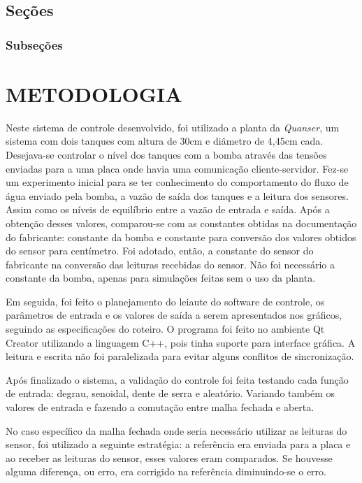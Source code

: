 \documentclass[a4paper,12pt]{article}
\begin{document}
\subsection{Seções}

\subsubsection{Subseções}

\newpage


\thispagestyle{main}

\section{METODOLOGIA}


\hspace{4ex}Neste sistema de controle desenvolvido, foi utilizado a planta da \textit{Quanser}, um sistema com dois tanques com altura de 30cm e diâmetro de 4,45cm cada. Desejava-se controlar o nível dos tanques com a bomba através das tensões enviadas para a uma placa onde havia uma comunicação cliente-servidor. Fez-se um experimento inicial para se ter conhecimento do comportamento do fluxo de água enviado pela bomba, a vazão de saída dos tanques e a leitura dos sensores. Assim como os níveis de equilíbrio entre a vazão de entrada e saída. Após a obtenção desses valores, comparou-se com as constantes obtidas na documentação do fabricante: constante da bomba e constante para conversão dos valores obtidos do sensor para centímetro. Foi adotado, então, a constante do  sensor do fabricante na conversão das leituras recebidas do sensor. Não foi necessário a constante da bomba, apenas para simulações feitas sem o uso da planta.

Em seguida, foi feito o planejamento do leiaute do software de controle, os parâmetros de entrada e os valores de saída a serem apresentados nos gráficos, seguindo as especificações do roteiro. O programa foi feito no ambiente Qt Creator utilizando a linguagem C++, pois tinha suporte para interface gráfica. A leitura e escrita não foi paralelizada para evitar alguns conflitos de sincronização. 

Após finalizado o sistema, a validação do controle foi feita testando cada função de entrada: degrau, senoidal, dente de serra e aleatório. Variando também os valores de entrada e fazendo a comutação entre malha fechada e aberta. 

No caso específico da malha fechada onde seria necessário utilizar as leituras do sensor, foi utilizado a seguinte estratégia: a referência era enviada para a placa e ao receber as leituras do sensor, esses valores eram comparados. Se houvesse alguma diferença, ou erro, era corrigido na referência diminuindo-se o erro.
\end{document}
